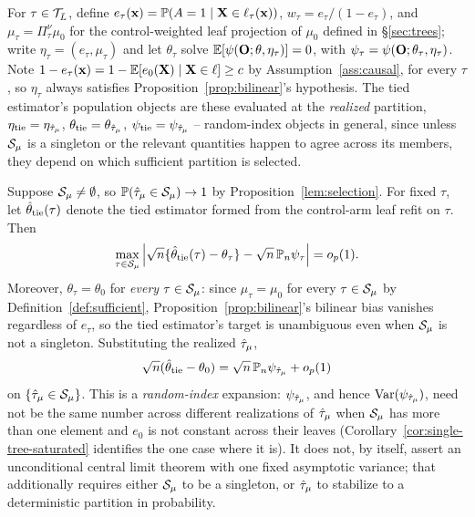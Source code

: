 \documentclass[12pt]{article}
\begin{document}
For $\tau\in\mathcal{T}_{\bar{L}}$, define $e_\tau(\mathbf{x})=\mathbb{P}(A=1\mid \mathbf{X}\in\ell_\tau(\mathbf{x}))$, $w_\tau=e_\tau/(1-e_\tau)$, and $\mu_\tau=\Pi^\nu_\tau\mu_0$ for the control-weighted leaf projection of $\mu_0$ defined in \S\ref{sec:trees}; write $\eta_\tau=(e_\tau,\mu_\tau)$ and let $\theta_\tau$ solve $\mathbb{E}[\psi(\mathbf{O};\theta,\eta_\tau)]=0$, with $\psi_\tau=\psi(\mathbf{O};\theta_\tau,\eta_\tau)$. Note $1-e_\tau(\mathbf{x})=1-\mathbb{E}[e_0(\mathbf{X})\mid\mathbf{X}\in\ell]\ge c$ by Assumption~\ref{ass:causal}, for every $\tau$, so $\eta_\tau$ always satisfies Proposition~\ref{prop:bilinear}'s hypothesis. The tied estimator's population objects are these evaluated at the \emph{realized} partition, $\eta_{\mathrm{tie}}=\eta_{\hat{\tau}_\mu}$, $\theta_{\mathrm{tie}}=\theta_{\hat{\tau}_\mu}$, $\psi_{\mathrm{tie}}=\psi_{\hat{\tau}_\mu}$ -- random-index objects in general, since unless $\mathcal{S}_\mu$ is a singleton or the relevant quantities happen to agree across its members, they depend on which sufficient partition is selected.

\begin{lemma}
\label{lem:single-tree-linear}
Suppose $\mathcal{S}_\mu\ne\emptyset$, so $\mathbb{P}(\hat{\tau}_\mu\in\mathcal{S}_\mu)\to1$ by Proposition~\ref{lem:selection}. For fixed $\tau$, let $\hat{\theta}_{\mathrm{tie}}(\tau)$ denote the tied estimator formed from the control-arm leaf refit on $\tau$. Then
\[
  \max_{\tau\in\mathcal{S}_\mu}
  \left|
    \sqrt n\{\hat{\theta}_{\mathrm{tie}}(\tau)-\theta_\tau\}
    -
    \sqrt n\,\mathbb{P}_n\psi_\tau
  \right|
  =o_p(1).
\]
Moreover, $\theta_\tau=\theta_0$ for \emph{every} $\tau\in\mathcal{S}_\mu$: since $\mu_\tau=\mu_0$ for every $\tau\in\mathcal{S}_\mu$ by Definition~\ref{def:sufficient}, Proposition~\ref{prop:bilinear}'s bilinear bias vanishes regardless of $e_\tau$, so the tied estimator's target is unambiguous even when $\mathcal{S}_\mu$ is not a singleton. Substituting the realized $\hat{\tau}_\mu$,
\[
  \sqrt n(\hat{\theta}_{\mathrm{tie}}-\theta_0)=\sqrt n\,\mathbb{P}_n\psi_{\hat{\tau}_\mu}+o_p(1)
\]
on $\{\hat{\tau}_\mu\in\mathcal{S}_\mu\}$. This is a \emph{random-index} expansion: $\psi_{\hat{\tau}_\mu}$, and hence $\operatorname{Var}(\psi_{\hat{\tau}_\mu})$, need not be the same number across different realizations of $\hat{\tau}_\mu$ when $\mathcal{S}_\mu$ has more than one element and $e_0$ is not constant across their leaves (Corollary~\ref{cor:single-tree-saturated} identifies the one case where it is). It does not, by itself, assert an unconditional central limit theorem with one fixed asymptotic variance; that additionally requires either $\mathcal{S}_\mu$ to be a singleton, or $\hat{\tau}_\mu$ to stabilize to a deterministic partition in probability.
\end{lemma}
\end{document}
